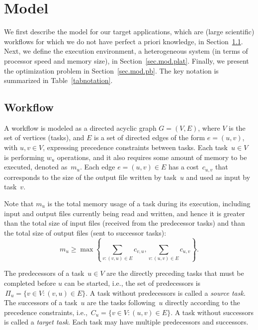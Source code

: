 \documentclass[conference]{IEEEtran}
\newcommand{\parents}[1]{\,\Pi_{#1}}
\newcommand{\children}[1]{\,C_{#1}}
\newcommand{\skug}[1]{{\color{blue}[SK: #1]}}
\begin{document}
\section{Model} %
\label{sec:model}

    We first describe the model for our target applications, which are (large scientific) workflows for which we do not have perfect a priori knowledge,
    in Section~\ref{sec.mod.work}.  Next, we define the execution
    environment, a heterogeneous system (in terms of processor speed and memory size),
    in Section~\ref{sec.mod.plat}. Finally, we present the optimization problem in
    Section~\ref{sec.mod.pb}. The key notation is summarized in Table~\ref{tabnotation}.

    \subsection{Workflow}
    \label{sec.mod.work}
    A workflow is modeled as a directed acyclic graph $G=(V, E)$, where $V$ is the set of vertices (tasks), and
    $E$ is a set of directed edges of the form $e=(u,v)$, with \mbox{$u,v\in V$}, expressing precedence constraints between tasks.
    Each task~$u \in V$  is performing $w_u$ operations, and it also
    requires some amount of memory to be executed, denoted as~$m_u$.
    Each edge $e=(u,v) \in E$ has a cost~$c_{u,v}$ that corresponds to the size of the output file written by task~$u$ and used as input by task~$v$.

    Note that $m_u$ is the total memory usage
    of a task during its execution, including input and output files currently being read and written,
    and hence it is greater than the total size of input files
    (received from the predecessor tasks) and than 
    the total size of  output files (sent to successor tasks): 
    $$   m_u \geq \max \left\{ \sum_{v:(v,u)\in E}c_{v,u}, \sum_{v:(u,v)\in E} c_{u,v} \right\} . $$
    

    The predecessors of a task~$u\in V$ are the directly preceding tasks that must be completed before $u$ can be started, i.e., the set of predecessors is
    $ \parents{u} = \{v \in V: (v,u) \in E\}$. A task without predecessors is called a {\it source task}.
    The successors of a task~$u$ are the tasks following~$u$ directly according to the precedence constraints, i.e.,
    $ \children{u} = \{v \in V: (u,v) \in E\}$. A task without successors is called a {\it target task}.
    Each task may have multiple predecessors and successors.
\end{document}
